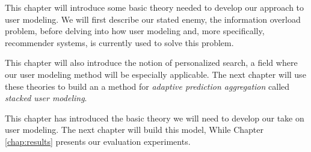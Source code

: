 \label{chap:theory}

This chapter will introduce some basic theory needed to develop our approach to user modeling.
We will first describe our stated enemy, the information overload problem, before delving into
how user modeling and, more specifically, recommender systems, is currently used to solve this problem.

This chapter will also introduce the notion of personalized search, a field where
our user modeling method will be especially applicable.
The next chapter will use these theories to build an 
a method for \emph{adaptive prediction aggregation}
called \emph{stacked user modeling}.






 
\hr

This chapter has introduced the basic theory we will need to develop our take on user modeling.
The next chapter will build this model,
While Chapter \ref{chap:results} presents our evaluation experiments.


